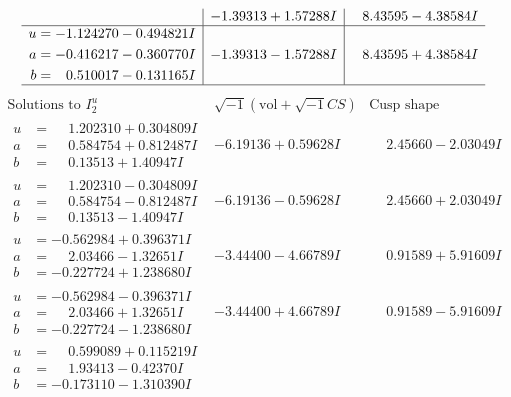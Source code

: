 \documentclass[1p]{elsarticle_modified}
\theoremstyle{definition}
\newcommand{\I}{\sqrt{-1}}
\begin{document}
$$\begin{array}{c|c|c}
 & -1.39313 + 1.57288 I & \phantom{-}8.43595 - 4.38584 I \\ \hline\begin{aligned}
u &= -1.124270 - 0.494821 I \\
a &= -0.416217 - 0.360770 I \\
b &= \phantom{-}0.510017 - 0.131165 I\end{aligned}
 & -1.39313 - 1.57288 I & \phantom{-}8.43595 + 4.38584 I\\
 \hline 
 \end{array}$$\newpage$$\begin{array}{c|c|c}  
\text{Solutions to }I^u_{2}& \I (\text{vol} + \sqrt{-1}CS) & \text{Cusp shape}\\
 \hline 
\begin{aligned}
u &= \phantom{-}1.202310 + 0.304809 I \\
a &= \phantom{-}0.584754 + 0.812487 I \\
b &= \phantom{-}0.13513 + 1.40947 I\end{aligned}
 & -6.19136 + 0.59628 I & \phantom{-}2.45660 - 2.03049 I \\ \hline\begin{aligned}
u &= \phantom{-}1.202310 - 0.304809 I \\
a &= \phantom{-}0.584754 - 0.812487 I \\
b &= \phantom{-}0.13513 - 1.40947 I\end{aligned}
 & -6.19136 - 0.59628 I & \phantom{-}2.45660 + 2.03049 I \\ \hline\begin{aligned}
u &= -0.562984 + 0.396371 I \\
a &= \phantom{-}2.03466 - 1.32651 I \\
b &= -0.227724 + 1.238680 I\end{aligned}
 & -3.44400 - 4.66789 I & \phantom{-}0.91589 + 5.91609 I \\ \hline\begin{aligned}
u &= -0.562984 - 0.396371 I \\
a &= \phantom{-}2.03466 + 1.32651 I \\
b &= -0.227724 - 1.238680 I\end{aligned}
 & -3.44400 + 4.66789 I & \phantom{-}0.91589 - 5.91609 I \\ \hline\begin{aligned}
u &= \phantom{-}0.599089 + 0.115219 I \\
a &= \phantom{-}1.93413 - 0.42370 I \\
b &= -0.173110 - 1.310390 I\end{aligned}

\end{array}$$
\end{document}
